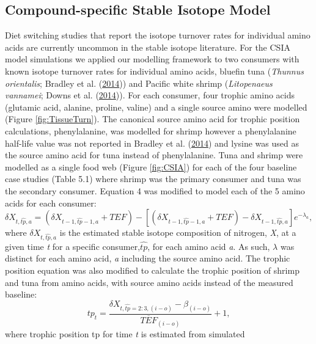\documentclass [11pt, proquest] {uwthesis}[2015/03/03]
\begin{document}
\subsection{Compound-specific Stable Isotope
Model}\label{compound-specific-stable-isotope-model}

Diet switching studies that report the isotope turnover rates for
individual amino acids are currently uncommon in the stable isotope
literature. For the CSIA model simulations we applied our modelling
framework to two consumers with known isotope turnover rates for
individual amino acids, bluefin tuna (\emph{Thunnus orientalis}; Bradley
et al. (\protect\hyperlink{ref-Bradley2014}{2014})) and Pacific white
shrimp (\emph{Litopenaeus vannamei}; Downs et al.
(\protect\hyperlink{ref-Downs2014}{2014})). For each consumer, four
trophic amino acids (glutamic acid, alanine, proline, valine) and a
single source amino were modelled (Figure \ref{fig:TissueTurn}). The
canonical source amino acid for trophic position calculations,
phenylalanine, was modelled for shrimp however a phenylalanine half-life
value was not reported in Bradley et al.
(\protect\hyperlink{ref-Bradley2014}{2014}) and lysine was used as the
source amino acid for tuna instead of phenylalanine. Tuna and shrimp
were modelled as a single food web (Figure \ref{fig:CSIA}) for each of
the four baseline case studies (Table 5.1) where shrimp was the primary
consumer and tuna was the secondary consumer. Equation 4 was modified to
model each of the 5 amino acids for each consumer:
\begin{equation} 
  \delta X_{t,\widehat{tp},a} = 
  (\delta X_{t-1, \widehat{tp}-1,a} + TEF) -
  [(\delta X_{t-1, \widehat{tp}-1,a}+TEF) - 
  \delta X_{t-1, \widehat{tp},a}]e^{-\lambda_a},
  \label{eq:seven}
\end{equation}
where \(\delta X_{t,\widehat{tp},a}\) is the estimated stable isotope
composition of nitrogen, \emph{X}, at a given time \emph{t} for a
specific consumer,\(\widehat{tp}\), for each amino acid \emph{a}. As
such, \(\lambda\) was distinct for each amino acid, \emph{a} including
the source amino acid. The trophic position equation was also modified
to calculate the trophic position of shrimp and tuna from amino acids,
with source amino acids instead of the measured baseline:
\begin{equation} 
  tp_t = \frac{\delta X_{t, \widehat{tp} = 2:3, (i-o)}
  -\beta_{(i-o)}}
  {\overline{TEF}_{(i-o)}} + 1,
  \label{eq:eight}
\end{equation}
where trophic position tp for time \emph{t} is estimated from simulated
\end{document}
